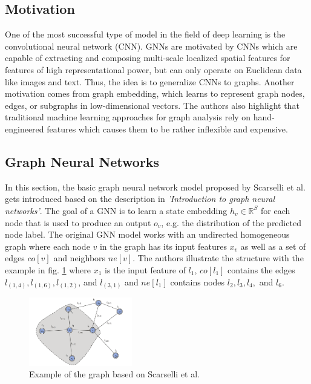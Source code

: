 \documentclass[a4paper,preprint]{sig-alternate}
\begin{document}
\subsection{Motivation}

One of the most successful type of model in the field of deep learning is the convolutional neural network (CNN).
GNNs are motivated by CNNs which are capable of extracting and composing multi-scale localized spatial features
for features of high representational power, but can only operate on Euclidean data like images and text.\cite{article}
Thus, the idea is to generalize CNNs to graphs.\newline
Another motivation comes from graph embedding, which learns to represent graph nodes, edges, or subgraphs in low-dimensional vectors.\cite{article}
The authors also highlight that traditional machine learning approaches for graph analysis rely on hand-engineered features which causes them
to be rather inflexible and expensive.

\subsection{Graph Neural Networks}

In this section, the basic graph neural network model proposed by Scarselli et al. \cite{4700287} gets introduced
based on the description in \textit{'Introduction to graph neural networks'}\cite{article}.\newline
The goal of a GNN is to learn a state embedding $h_v \in \mathbb{R}^S$ for each node that is used to produce an 
output $o_v$, e.g. the distribution of the predicted node label.
The original GNN model works with an undirected homogeneous graph where each node $v$ in the graph has its input features $x_v$
as well as a set of edges $co[v]$ and neighbors $ne[v]$. The authors illustrate the structure with the example in fig. \ref{fig:graph}
where $x_{1}$ is the input feature of $l_1$, $co[l_1]$ contains the edges $l_{(1, 4)}, l_{(1, 6)}, l_{(1, 2)}$, and $l_{(3, 1)}$ and $ne[l_1]$
contains nodes $l_2, l_3, l_4,$ and $l_6$.

\begin{figure}[h]
    \centering
    \includegraphics[width=0.4\textwidth]{img/graph.png}
    \caption{Example of the graph based on Scarselli et al. \cite{article}}
    \label{fig:graph}
\end{figure}
\end{document}
